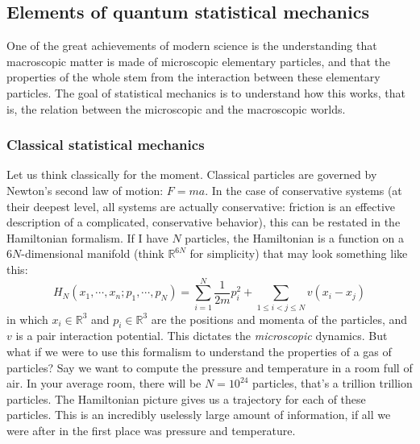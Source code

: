 \documentclass{ian}
\begin{document}
\subsection{Elements of quantum statistical mechanics}
\indent
One of the great achievements of modern science is the understanding that macroscopic matter is made of microscopic elementary particles, and that the properties of the whole stem from the interaction between these elementary particles.
The goal of statistical mechanics is to understand how this works, that is, the relation between the microscopic and the macroscopic worlds.
\bigskip

\subsubsection{Classical statistical mechanics}
\indent
Let us think classically for the moment.
Classical particles are governed by Newton's second law of motion: $F=ma$.
In the case of conservative systems (at their deepest level, all systems are actually conservative: friction is an effective description of a complicated, conservative behavior), this can be restated in the Hamiltonian formalism.
If I have $N$ particles, the Hamiltonian is a function on a $6N$-dimensional manifold (think $\mathbb R^{6N}$ for simplicity) that may look something like this:
\begin{equation}
  H_N(x_1,\cdots,x_n;p_1,\cdots,p_N)=\sum_{i=1}^N\frac1{2m}p_i^2+\sum_{1\leqslant i<j\leqslant N}v(x_i-x_j)
  \label{H_classical}
\end{equation}
in which $x_i\in\mathbb R^3$ and $p_i\in\mathbb R^3$ are the positions and momenta of the particles, and $v$ is a pair interaction potential.
This dictates the {\it microscopic} dynamics.
But what if we were to use this formalism to understand the properties of a gas of particles?
Say we want to compute the pressure and temperature in a room full of air.
In your average room, there will be $N=10^{24}$ particles, that's a trillion trillion particles.
The Hamiltonian picture gives us a trajectory for each of these particles.
This is an incredibly uselessly large amount of information, if all we were after in the first place was pressure and temperature.
\bigskip
\end{document}
